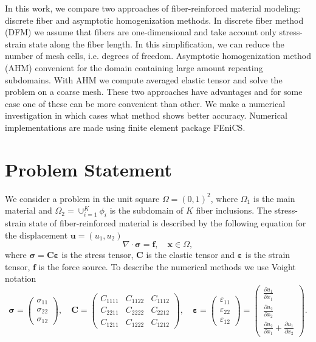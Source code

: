 \documentclass[a4paper]{jpconf}
\begin{document}
In this work, we compare two approaches of fiber-reinforced material modeling: discrete fiber and asymptotic homogenization methods. In discrete fiber method (DFM) we assume that fibers are one-dimensional and take account only stress-strain state along the fiber length. In this simplification, we can reduce the number of mesh cells, i.e. degrees of freedom. Asymptotic homogenization method (AHM)\cite{pinho-da-crus2009asymptotic,oliveira2009asymptotic,pellegrino1999numerical,yuan2008toward} convenient for the domain containing large amount repeating subdomains. With AHM we compute averaged elastic tensor and solve the problem on a coarse mesh. These two approaches have advantages and for some case one of these can be more convenient than other. We make a numerical investigation in which cases what method shows better accuracy. Numerical implementations are made using finite element package FEniCS\cite{fenics2012}.

\section{Problem Statement} 

We consider a problem in the unit square $\Omega=(0,1)^2$, where $\Omega_1$ is the main material and $\Omega_2=\cup_{i=1}^K \phi_i$ is the subdomain of $K$ fiber inclusions.
The stress-strain state of fiber-reinforced material is described by the following equation for the displacement $\bm{u}=(u_1, u_2)$
\begin{equation}
\nabla \cdot \bm{\sigma} = \bm{f}, \quad \bm{x} \in \Omega,
\label{eq:displacement}
\end{equation}
where $\bm{\sigma}=\bm{C}\bm{\varepsilon}$ is the stress tensor, $\bm{C}$ is the elastic tensor and $\bm{\varepsilon}$ is the strain tensor, $\bm{f}$ is the force source.
To describe the numerical methods we use Voight notation
\[
\bm{\sigma} = \left(
\begin{matrix}\sigma_{11}\\ \sigma_{22}\\ \sigma_{12}\end{matrix}
\right), \quad
\bm{C} = \left( \begin{matrix}
C_{1111} & C_{1122} & C_{1112}  \\
C_{2211} & C_{2222} & C_{2212}  \\
C_{1211} & C_{1222} & C_{1212}  
\end{matrix}  \right), \quad
\bm{\varepsilon} = \left(
\begin{matrix}\varepsilon_{11}\\ \varepsilon_{22}\\ \varepsilon_{12}\end{matrix}
\right) = \left( \begin{matrix}\frac{\partial u_1}{\partial x_1}\\ \frac{\partial u_2}{\partial x_2} \\ \frac{\partial u_2}{\partial x_1} + \frac{\partial u_1}{\partial x_2} \end{matrix} \right).
\]
\end{document}
